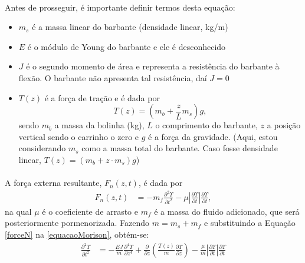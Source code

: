 \documentclass[a4paper,11pt]{scrartcl} %
\numberwithin{equation}{section} %
\numberwithin{figure}{section} %
\numberwithin{table}{section} %
\begin{document}
\paragraph{} Antes de prosseguir, é importante definir termos desta equação: \begin{itemize}
	\item $m_s$ é a massa linear do barbante (densidade linear, kg/m)
	\item $E$ é o módulo de Young do barbante e ele é desconhecido
	\item $J$ é o segundo momento de área e representa a resistência do barbante à flexão. O barbante não apresenta tal resistência, daí $J=0$
	\item $T(z)$ é a força de tração e é dada por \[T(z) = \left(m_b+\frac{z}{L}m_s\right)g,\] sendo $m_b$ a massa da bolinha (kg), $L$ o comprimento do barbante, $z$ a posição vertical sendo o carrinho o zero e $g$ é a força da gravidade. (Aqui, estou considerando $m_s$ como a massa total do barbante. Caso fosse densidade linear, $T(z) = (m_b + z\cdot m_s) g$)
\end{itemize}

\paragraph{} A força externa resultante, $F_n(z,t)$, é dada por \begin{align}
	F_n(z,t) &= -m_f \frac{\partial^2 \Upsilon}{\partial t^2} - \mu \left|\frac{\partial \Upsilon}{\partial t}\right|\frac{\partial \Upsilon}{\partial t}\label{forceN},
\end{align} na qual $\mu$ é o coeficiente de arrasto e $m_f$ é a massa do fluido adicionado, que será posteriormente pormenorizada. Fazendo $m = m_s + m_f$ e substituindo a Equação \ref{forceN} na \ref{equacaoMorison}, obtém-se: \begin{align}
	\frac{\partial^2 \Upsilon}{\partial t^2} &= -\frac{EJ}{m}\frac{\partial^4 \Upsilon}{\partial z^4} + \frac{\partial}{\partial z}\left(\frac{T(z)}{m}\frac{\partial \Upsilon}{\partial z}\right) - \frac{\mu}{m}\left|\frac{\partial \Upsilon}{\partial t}\right|\frac{\partial \Upsilon}{\partial t}
\end{align}
\end{document}
